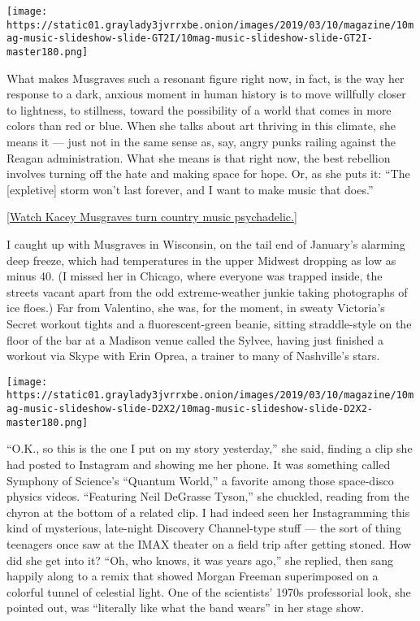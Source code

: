 \texttt{[image: https://static01.graylady3jvrrxbe.onion/images/2019/03/10/magazine/10mag-music-slideshow-slide-GT2I/10mag-music-slideshow-slide-GT2I-master180.png]}

What makes Musgraves such a resonant figure right now, in fact, is the
way her response to a dark, anxious moment in human history is to move
willfully closer to lightness, to stillness, toward the possibility of a
world that comes in more colors than red or blue. When she talks about
art thriving in this climate, she means it --- just not in the same
sense as, say, angry punks railing against the Reagan administration.
What she means is that right now, the best rebellion involves turning
off the hate and making space for hope. Or, as she puts it: ``The
{[}expletive{]} storm won't last forever, and I want to make music that
does.''

{[}\href{https://www.nytimes3xbfgragh.onion/2018/10/24/arts/music/kacey-musgraves-slow-burn.html}{Watch
Kacey Musgraves turn country music psychadelic.}{]}

I caught up with Musgraves in Wisconsin, on the tail end of January's
alarming deep freeze, which had temperatures in the upper Midwest
dropping as low as minus 40. (I missed her in Chicago, where everyone
was trapped inside, the streets vacant apart from the odd
extreme-weather junkie taking photographs of ice floes.) Far from
Valentino, she was, for the moment, in sweaty Victoria's Secret workout
tights and a fluorescent-green beanie, sitting straddle-style on the
floor of the bar at a Madison venue called the Sylvee, having just
finished a workout via Skype with Erin Oprea, a trainer to many of
Nashville's stars.

\texttt{[image: https://static01.graylady3jvrrxbe.onion/images/2019/03/10/magazine/10mag-music-slideshow-slide-D2X2/10mag-music-slideshow-slide-D2X2-master180.png]}

``O.K., so this is the one I put on my story yesterday,'' she said,
finding a clip she had posted to Instagram and showing me her phone. It
was something called Symphony of Science's ``Quantum World,'' a favorite
among those space-disco physics videos. ``Featuring Neil DeGrasse
Tyson,'' she chuckled, reading from the chyron at the bottom of a
related clip. I had indeed seen her Instagramming this kind of
mysterious, late-night Discovery Channel-type stuff --- the sort of
thing teenagers once saw at the IMAX theater on a field trip after
getting stoned. How did she get into it? ``Oh, who knows, it was years
ago,'' she replied, then sang happily along to a remix that showed
Morgan Freeman superimposed on a colorful tunnel of celestial light. One
of the scientists' 1970s professorial look, she pointed out, was
``literally like what the band wears'' in her stage show.

